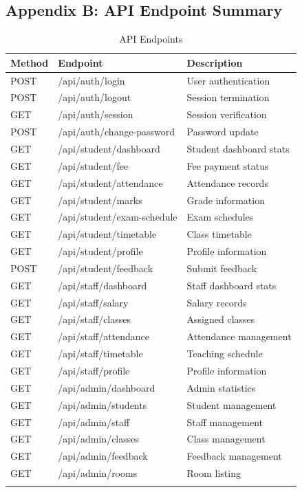 \documentclass[12pt,a4paper]{article}
\begin{document}
\subsection{Appendix B: API Endpoint Summary}

\begin{longtable}{|l|l|p{5cm}|}
\hline
\textbf{Method} & \textbf{Endpoint} & \textbf{Description} \\
\hline
\endhead
POST & /api/auth/login & User authentication \\
POST & /api/auth/logout & Session termination \\
GET & /api/auth/session & Session verification \\
POST & /api/auth/change-password & Password update \\
\hline
GET & /api/student/dashboard & Student dashboard stats \\
GET & /api/student/fee & Fee payment status \\
GET & /api/student/attendance & Attendance records \\
GET & /api/student/marks & Grade information \\
GET & /api/student/exam-schedule & Exam schedules \\
GET & /api/student/timetable & Class timetable \\
GET & /api/student/profile & Profile information \\
POST & /api/student/feedback & Submit feedback \\
\hline
GET & /api/staff/dashboard & Staff dashboard stats \\
GET & /api/staff/salary & Salary records \\
GET & /api/staff/classes & Assigned classes \\
GET & /api/staff/attendance & Attendance management \\
GET & /api/staff/timetable & Teaching schedule \\
GET & /api/staff/profile & Profile information \\
\hline
GET & /api/admin/dashboard & Admin statistics \\
GET & /api/admin/students & Student management \\
GET & /api/admin/staff & Staff management \\
GET & /api/admin/classes & Class management \\
GET & /api/admin/feedback & Feedback management \\
GET & /api/admin/rooms & Room listing \\
\hline
\caption{API Endpoints}
\end{longtable}
\end{document}
